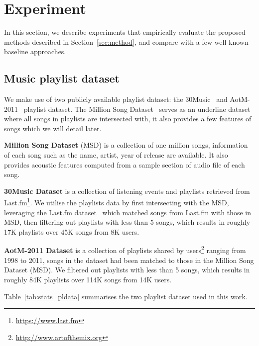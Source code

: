 \section{Experiment}
\label{sec:experiment}

In this section, we describe experiments that empirically evaluate the proposed methods
described in Section~\ref{sec:method}, and compare with a few well known baseline approaches.

\subsection{Music playlist dataset}
We make use of two publicly available playlist dataset: the 30Music~\cite{30music2015} and AotM-2011~\cite{mcfee2012hypergraph} playlist dataset.
The Million Song Dataset~\cite{msd2011} serves as an underline dataset where all songs in playlists are intersected with,
it also provides a few features of songs which we will detail later.

{\bf Million Song Dataset} (MSD) is a collection of one million songs, information of each song such as the name, artist, year of release are available.
It also provides acoustic features computed from a sample section of audio file of each song. %

{\bf 30Music Dataset} is a collection of listening events and playlists retrieved from Last.fm\footnote{\url{https://www.last.fm}}.
We utilise the playlists data by first intersecting with the MSD, leveraging the Last.fm dataset~\cite{lastfmdataset} 
which matched songs from Last.fm with those in MSD, then filtering out playlists with less than 5 songs, 
which results in roughly 17K playlists over 45K songs from 8K users.

{\bf AotM-2011 Dataset} is a collection of playlists shared by users\footnote{\url{http://www.artofthemix.org}} ranging from 1998 to 2011, 
songs in the dataset had been matched to those in the Million Song Dataset (MSD).
We filtered out playlists with less than 5 songs, which results in roughly 84K playlists over 114K songs from 14K users.

Table~\ref{tab:stats_pldata} summarises the two playlist dataset used in this work.
%
\begin{table}[!h]
\centering
\caption{Statistics of music playlist dataset}
\label{tab:stats_pldata}
\end{table}



